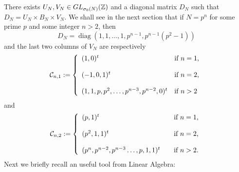 \documentclass[a4paper,11pt]{amsart}
\begin{document}
There exists $U_N, V_N\in GL_{\sigma_0(N)}(\mathbb{Z})$ and  a diagonal matrix $D_N$ such that $D_N=U_N\times B_N\times V_N$. %
We shall see in the next section that if $N=p^n$ for some prime $p$ and some integer $n>2$, then \begin{equation}D_N=\operatorname{diag}(1,1,\hdots,1,p^{n-1},p^{n-1}(p^2-1))\label{k5}\end{equation}                                                                                                                                                                
and the last two columns of $V_N$ are respectively 
\begin{equation}\mathcal{C}_{n,1}:=\left\{\begin{array}{ll}
(1,0)^t&\text{if $n=1$,}\\
\\
(-1,0,1)^t&\text{if $n=2$,}\\
\\
(1,1,p,p^2,\hdots,p^{n-3},p^{n-2},0)^t&\text{if $n>2$}
                             \end{array}\right.
\end{equation}
and
\begin{equation}
\mathcal{C}_{n,2}:=\left\{\begin{array}{ll}
(p,1)^t&\text{\quad if $n=1$,}\\
\\
(p^2,1,1)^t&\text{\quad if $n=2$,}\\   
\\
(p^n,p^{n-2},p^{n-3}\hdots,p,1,1)^t&\text{\quad if $n>2$.}      
             \end{array}\right.
\end{equation}  %
Next we %
briefly recall %
an useful tool from Linear Algebra:
\end{document}
